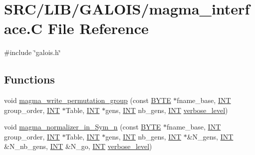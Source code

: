 \hypertarget{magma__interface_8_c}{}\section{S\+R\+C/\+L\+I\+B/\+G\+A\+L\+O\+I\+S/magma\+\_\+interface.C File Reference}
\label{magma__interface_8_c}
{\ttfamily \#include \char`\"{}galois.\+h\char`\"{}}\newline
\subsection*{Functions}
\begin{DoxyCompactItemize}
\item 
void \mbox{\hyperlink{magma__interface_8_c_a0079751a442750cbba5b5a13f738b91c}{magma\+\_\+write\+\_\+permutation\+\_\+group}} (const \mbox{\hyperlink{galois_8h_ab6cc7b4aeb6ea31aba2b3fbfc83ff5e6}{B\+Y\+TE}} $\ast$fname\+\_\+base, \mbox{\hyperlink{galois_8h_a09fddde158a3a20bd2dcadb609de11dc}{I\+NT}} group\+\_\+order, \mbox{\hyperlink{galois_8h_a09fddde158a3a20bd2dcadb609de11dc}{I\+NT}} $\ast$Table, \mbox{\hyperlink{galois_8h_a09fddde158a3a20bd2dcadb609de11dc}{I\+NT}} $\ast$gens, \mbox{\hyperlink{galois_8h_a09fddde158a3a20bd2dcadb609de11dc}{I\+NT}} nb\+\_\+gens, \mbox{\hyperlink{galois_8h_a09fddde158a3a20bd2dcadb609de11dc}{I\+NT}} \mbox{\hyperlink{simeon_8_c_a818073fbcc2f439e7c56952f67386122}{verbose\+\_\+level}})
\item 
void \mbox{\hyperlink{magma__interface_8_c_aa2528f65b43c2ceade89234d07fe58c9}{magma\+\_\+normalizer\+\_\+in\+\_\+\+Sym\+\_\+n}} (const \mbox{\hyperlink{galois_8h_ab6cc7b4aeb6ea31aba2b3fbfc83ff5e6}{B\+Y\+TE}} $\ast$fname\+\_\+base, \mbox{\hyperlink{galois_8h_a09fddde158a3a20bd2dcadb609de11dc}{I\+NT}} group\+\_\+order, \mbox{\hyperlink{galois_8h_a09fddde158a3a20bd2dcadb609de11dc}{I\+NT}} $\ast$Table, \mbox{\hyperlink{galois_8h_a09fddde158a3a20bd2dcadb609de11dc}{I\+NT}} $\ast$gens, \mbox{\hyperlink{galois_8h_a09fddde158a3a20bd2dcadb609de11dc}{I\+NT}} nb\+\_\+gens, \mbox{\hyperlink{galois_8h_a09fddde158a3a20bd2dcadb609de11dc}{I\+NT}} $\ast$\&N\+\_\+gens, \mbox{\hyperlink{galois_8h_a09fddde158a3a20bd2dcadb609de11dc}{I\+NT}} \&N\+\_\+nb\+\_\+gens, \mbox{\hyperlink{galois_8h_a09fddde158a3a20bd2dcadb609de11dc}{I\+NT}} \&N\+\_\+go, \mbox{\hyperlink{galois_8h_a09fddde158a3a20bd2dcadb609de11dc}{I\+NT}} \mbox{\hyperlink{simeon_8_c_a818073fbcc2f439e7c56952f67386122}{verbose\+\_\+level}})
\item 

\end{DoxyCompactItemize}
